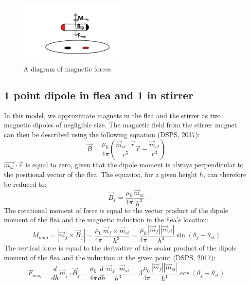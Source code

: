 \documentclass[10pt,a4paper]{article}
\begin{document}
\begin{figure}[H]
  \centering
  \includegraphics[width=0.5\textwidth]{michacka_sily_schema.png}
  \caption{A diagram of magnetic forces}
  \label{obr:michacka}
\end{figure}

\subsection{1 point dipole in flea and 1 in stirrer}
In this model, we approximate magnets in the flea and the stirrer as two magnetic dipoles of negligible size. The magnetic field from the stirrer magnet can then be described using the following equation (DSPS, 2017):
\begin{equation}
\vec{B} = \frac{\mu_{0}}{4 \pi} \left(\frac{\vec{m}_{st} \cdot \vec{r}}{r^5}\vec{r} - \frac{\vec{m}_{st}}{r^3}\right)
\label{indukce:dipol}
\end{equation}
$\vec{m_{st}} \cdot \vec{r}$ is equal to zero, given that the dipole moment is always perpendicular to the positional vector of the flea.
The equation, for a given height $h$, can therefore be reduced to:
\begin{equation}
\vec{B}_{f} = \frac{\mu_{0}}{4 \pi} \frac{\vec{m}_{st}}{h^3}
\label{indukce1dipol:blecha}
\end{equation}
The rotational moment of force is equal to the vector product of the dipole moment of the flea and the magnetic induction in the flea's location:
\begin{equation}
M_{mag} = |\vec{m}_f \times \vec{B}_f| = \frac{\mu_{0}}{4 \pi} \frac{\vec{m}_f\times \vec{m}_{st}}{h^3} = \frac{\mu_{0}}{4 \pi} \frac{|\vec{m}_f||\vec{m}_{st}|}{h^3}\sin(\theta_f - \theta_{st})
\label{moment1dipol}
\end{equation}
The vertical force is equal to the derivative of the scalar product of the dipole moment of the flea and the induction at the given point (DSPS, 2017):
\begin{equation}
F_{mag} = \frac{d}{dh} \vec{m}_f \cdot \vec{B}_f = \frac{\mu_{0}}{4 \pi} \frac{d}{dh} \frac{\vec{m}_f \cdot \vec{m}_{st}}{h^3} =  3 \frac{\mu_{0}}{4 \pi} \frac{|\vec{m}_f||\vec{m}_{st}|}{h^4}\cos(\theta_f - \theta_{st})
\label{sila1dipol}
\end{equation}
\end{document}
